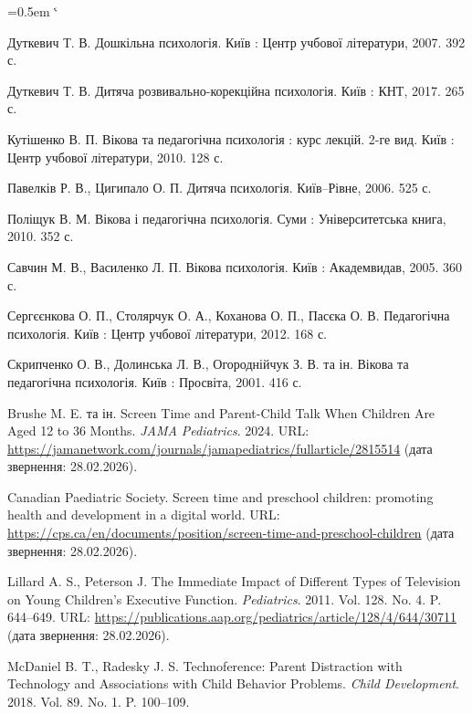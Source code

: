 \documentclass[14pt, a4paper]{extreport}
\makeatletter
\renewcommand{\@biblabel}[1]{#1.}
\renewenvironment{thebibliography}[1]
  {\list{\@biblabel{\arabic{enumiv}}}%
     {\settowidth\labelwidth{\@biblabel{#1}}%
      \leftmargin=1.25cm
      \labelsep=0.5em
      \itemsep=0.3\baselineskip
      \parsep=0pt
      \usecounter{enumiv}%
      \let\p@enumiv\@empty
      \renewcommand\theenumiv{\arabic{enumiv}}}%
   \sloppy\clubpenalty4000\widowpenalty4000\sfcode`\.\@m}
  {\endlist}
\makeatother
\begin{document}
\begin{thebibliography}{99}

Дуткевич Т. В. Дошкільна психологія. Київ : Центр учбової літератури, 2007. 392 с.

Дуткевич Т. В. Дитяча розвивально-корекційна психологія. Київ : КНТ, 2017. 265 с.

Кутішенко В. П. Вікова та педагогічна психологія : курс лекцій. 2-ге вид. Київ : Центр учбової літератури, 2010. 128 с.

Павелків Р. В., Цигипало О. П. Дитяча психологія. Київ--Рівне, 2006. 525 с.

Поліщук В. М. Вікова і педагогічна психологія. Суми : Університетська книга, 2010. 352 с.

Савчин М. В., Василенко Л. П. Вікова психологія. Київ : Академвидав, 2005. 360 с.

Сергєєнкова О. П., Столярчук О. А., Коханова О. П., Пасєка О. В. Педагогічна психологія. Київ : Центр учбової літератури, 2012. 168 с.

Скрипченко О. В., Долинська Л. В., Огороднійчук З. В. та ін. Вікова та педагогічна психологія. Київ : Просвіта, 2001. 416 с.

Brushe M. E. та ін. Screen Time and Parent-Child Talk When Children Are Aged 12 to 36 Months. \textit{JAMA Pediatrics}. 2024. URL: \url{https://jamanetwork.com/journals/jamapediatrics/fullarticle/2815514} (дата звернення: 28.02.2026).

Canadian Paediatric Society. Screen time and preschool children: promoting health and development in a digital world. URL: \url{https://cps.ca/en/documents/position/screen-time-and-preschool-children} (дата звернення: 28.02.2026).

Lillard A. S., Peterson J. The Immediate Impact of Different Types of Television on Young Children’s Executive Function. \textit{Pediatrics}. 2011. Vol. 128. No. 4. P. 644--649. URL: \url{https://publications.aap.org/pediatrics/article/128/4/644/30711} (дата звернення: 28.02.2026).

McDaniel B. T., Radesky J. S. Technoference: Parent Distraction with Technology and Associations with Child Behavior Problems. \textit{Child Development}. 2018. Vol. 89. No. 1. P. 100--109.


\end{thebibliography}
\end{document}
